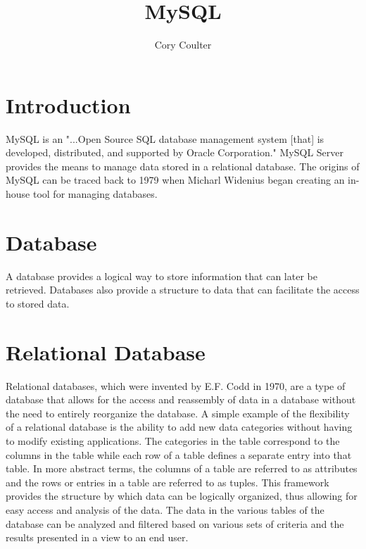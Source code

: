 \documentclass[9pt,twocolumn,twoside]{styles/osajnl}
\title{MySQL}
\author[1,*, +]{Cory Coulter}
\affil[1]{School of Informatics and Computing, Bloomington, IN 47408, U.S.A.}
\affil[*]{Corresponding Authors: cacoulte11@gmail.com}
\affil[+]{HID - S17-IO-3004}
\begin{document}
\maketitle

\section{Introduction}
MySQL is an "...Open Source SQL database management system [that] is
developed, distributed, and supported by Oracle Corporation."
\cite{devmysql} MySQL Server provides the means to manage data stored
in a relational database. \cite{devmysql} The origins of MySQL can be
traced back to 1979 when Micharl Widenius began creating an in-house
tool for managing databases. \cite{mik}

\section{Database}
A database provides a logical way to store information that can later
be retrieved. \cite{mysqlbible} Databases also provide a structure to
data that can facilitate the access to stored data.

\section{Relational Database}
Relational databases, which were invented by E.F. Codd in 1970, are a
type of database that allows for the access and reassembly of data in
a database without the need to entirely reorganize the
database. \cite{searchsql} A simple example of the flexibility of a
relational database is the ability to add new data categories without
having to modify existing applications. \cite{searchsql} The
categories in the table correspond to the columns in the table while
each row of a table defines a separate entry into that
table. \cite{ibm} In more abstract terms, the columns of a table are
referred to as attributes and the rows or entries in a table are
referred to as tuples. This framework provides the structure by which
data can be logically organized, thus allowing for easy access and
analysis of the data. The data in the various tables of the database
can be analyzed and filtered based on various sets of criteria and the
results presented in a view to an end user. \cite{searchsql}
\end{document}
